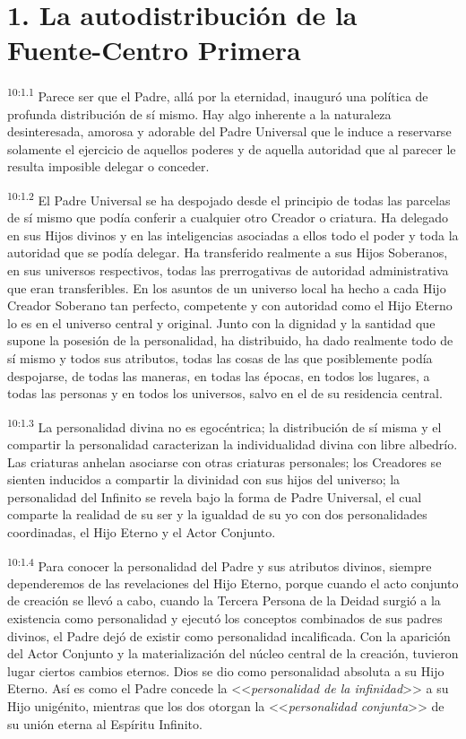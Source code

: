 \section*{1. La autodistribución de la Fuente-Centro Primera}
\par
\textsuperscript{10:1.1} Parece ser que el Padre, allá por la eternidad, inauguró una política de profunda distribución de sí mismo. Hay algo inherente a la naturaleza desinteresada, amorosa y adorable del Padre Universal que le induce a reservarse solamente el ejercicio de aquellos poderes y de aquella autoridad que al parecer le resulta imposible delegar o conceder.

\par
\textsuperscript{10:1.2} El Padre Universal se ha despojado desde el principio de todas las parcelas de sí mismo que podía conferir a cualquier otro Creador o criatura. Ha delegado en sus Hijos divinos y en las inteligencias asociadas a ellos todo el poder y toda la autoridad que se podía delegar. Ha transferido realmente a sus Hijos Soberanos, en sus universos respectivos, todas las prerrogativas de autoridad administrativa que eran transferibles. En los asuntos de un universo local ha hecho a cada Hijo Creador Soberano tan perfecto, competente y con autoridad como el Hijo Eterno lo es en el universo central y original. Junto con la dignidad y la santidad que supone la posesión de la personalidad, ha distribuido, ha dado realmente todo de sí mismo y todos sus atributos, todas las cosas de las que posiblemente podía despojarse, de todas las maneras, en todas las épocas, en todos los lugares, a todas las personas y en todos los universos, salvo en el de su residencia central.

\par
\textsuperscript{10:1.3} La personalidad divina no es egocéntrica; la distribución de sí misma y el compartir la personalidad caracterizan la individualidad divina con libre albedrío. Las criaturas anhelan asociarse con otras criaturas personales; los Creadores se sienten inducidos a compartir la divinidad con sus hijos del universo; la personalidad del Infinito se revela bajo la forma de Padre Universal, el cual comparte la realidad de su ser y la igualdad de su yo con dos personalidades coordinadas, el Hijo Eterno y el Actor Conjunto.

\par
\textsuperscript{10:1.4} Para conocer la personalidad del Padre y sus atributos divinos, siempre dependeremos de las revelaciones del Hijo Eterno, porque cuando el acto conjunto de creación se llevó a cabo, cuando la Tercera Persona de la Deidad surgió a la existencia como personalidad y ejecutó los conceptos combinados de sus padres divinos, el Padre dejó de existir como personalidad incalificada. Con la aparición del Actor Conjunto y la materialización del núcleo central de la creación, tuvieron lugar ciertos cambios eternos. Dios se dio como personalidad absoluta a su Hijo Eterno. Así es como el Padre concede la <<\textit{personalidad de la infinidad}>> a su Hijo unigénito, mientras que los dos otorgan la <<\textit{personalidad conjunta}>> de su unión eterna al Espíritu Infinito.

